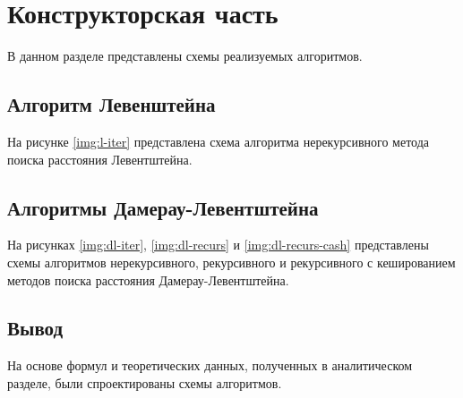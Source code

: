 \chapter{Конструкторская часть}

В данном разделе представлены схемы реализуемых алгоритмов.

\section{Алгоритм Левенштейна}

На рисунке \ref{img:l-iter} представлена схема алгоритма нерекурсивного метода поиска расстояния Левентштейна.


\section{Алгоритмы Дамерау-Левентштейна}

На рисунках \ref{img:dl-iter}, \ref{img:dl-recurs} и \ref{img:dl-recurs-cash} представлены схемы алгоритмов нерекурсивного, рекурсивного и рекурсивного с кешированием методов поиска расстояния Дамерау-Левентштейна.

\clearpage
{}

\section*{Вывод}

На основе формул и теоретических данных, полученных в аналитическом разделе, были спроектированы схемы алгоритмов.

